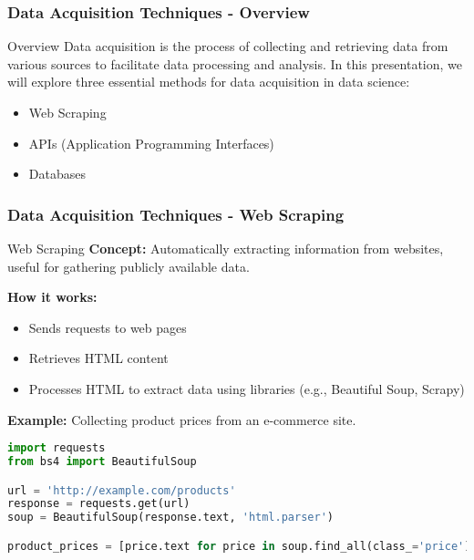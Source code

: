 \documentclass[aspectratio=169]{beamer}
\begin{document}
\begin{frame}[fragile]
    \frametitle{Data Acquisition Techniques - Overview}
    \begin{block}{Overview}
        Data acquisition is the process of collecting and retrieving data from various sources to facilitate data processing and analysis. 
        In this presentation, we will explore three essential methods for data acquisition in data science:
        \begin{itemize}
            \item Web Scraping
            \item APIs (Application Programming Interfaces)
            \item Databases
        \end{itemize}
    \end{block}
\end{frame}

\begin{frame}[fragile]
    \frametitle{Data Acquisition Techniques - Web Scraping}
    \begin{block}{Web Scraping}
        \textbf{Concept:} Automatically extracting information from websites, useful for gathering publicly available data.
        
        \textbf{How it works:}
        \begin{itemize}
            \item Sends requests to web pages
            \item Retrieves HTML content
            \item Processes HTML to extract data using libraries (e.g., Beautiful Soup, Scrapy)
        \end{itemize}
        
        \textbf{Example:} 
        Collecting product prices from an e-commerce site. 
    \end{block}
    
    \begin{lstlisting}[language=Python]
import requests
from bs4 import BeautifulSoup

url = 'http://example.com/products'
response = requests.get(url)
soup = BeautifulSoup(response.text, 'html.parser')

product_prices = [price.text for price in soup.find_all(class_='price')]
    \end{lstlisting}
\end{frame}
\end{document}
